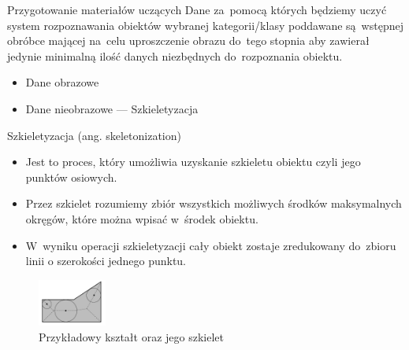 \documentclass{beamer}
\begin{document}
\begin{frame}{Przygotowanie materiałów uczących}
Dane za~pomocą których będziemy uczyć system rozpoznawania obiektów wybranej kategorii/klasy poddawane są~wstępnej obróbce mającej na~celu uproszczenie obrazu do~tego stopnia aby zawierał jedynie minimalną ilość danych niezbędnych do~rozpoznania obiektu.
\pause
\begin{itemize}
\item Dane obrazowe
\pause
\item Dane nieobrazowe --- Szkieletyzacja 
\end{itemize}
\end{frame}


\begin{frame}{Szkieletyzacja (ang. skeletonization)}
\begin{itemize}
\item Jest to proces, który umożliwia uzyskanie szkieletu obiektu czyli jego punktów osiowych.
\pause
\item Przez szkielet rozumiemy zbiór wszystkich możliwych środków maksymalnych okręgów, które można wpisać w~środek obiektu.
\pause
\item W~wyniku operacji szkieletyzacji cały obiekt zostaje zredukowany do~zbioru linii o szerokości jednego punktu.
\pause
\end{itemize}

\begin{figure}
	\centering
		\includegraphics[width=0.2\textwidth]{szkieletyzacja.png}
		\caption{Przykładowy kształt oraz jego szkielet}
\end{figure}

\end{frame}
\end{document}
